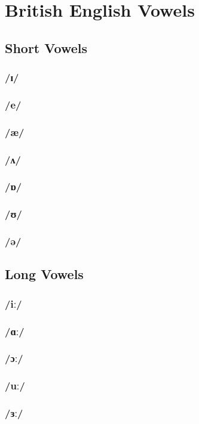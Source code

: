 \chapter{British English Vowels}

\section{Short Vowels}
\subsection{/ɪ/}
\subsection{/e/}
\subsection{/æ/}
\subsection{/ʌ/}
\subsection{/ɒ/}
\subsection{/ʊ/}
\subsection{/ə/}

\section{Long Vowels}
\subsection{/iː/}
\subsection{/ɑː/}
\subsection{/ɔː/}
\subsection{/uː/}
\subsection{/ɜː/}

